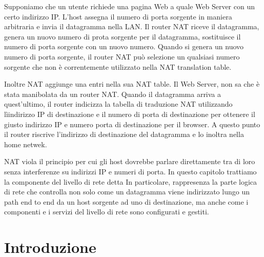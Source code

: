 \documentclass{book}
\newcommand{\tmtextbf}[1]{\text{{\bfseries{#1}}}}
\begin{document}
Supponiamo che un utente richiede una pagina Web a quale Web Server con un
certo indirizzo IP. L'host assegna il numero di porta sorgente in maniera
arbitraria e invia il datagramma nella LAN. Il router NAT riceve il
datagramma, genera un nuovo numero di prota sorgente per il datagramma,
sostituisce il numero di porta sorgente con un nuovo numero. Quando si genera
un nuovo numero di porta sorgente, il router NAT pu{\`o} selezione un
qualsiasi numero sorgente che non {\`e} correntemente utilizzato nella NAT
translation table.

Inoltre NAT aggiunge una entri nella sua NAT table. Il Web Server, non sa che
{\`e} stata manibolata da un router NAT. Quando il datagramma arriva a
quest'ultimo, il router indicizza la tabella di traduzione NAT utilizzando
l{\`i}indirizzo IP di destinazione e il numero di porta di destinazione per
ottenere il giusto indirizzo IP e numero porta di destinazione per il browser.
A questo punto il router riscrive l'indirizzo di destinazione del datagramma e
lo inoltra nella home netwek.

NAT viola il principio per cui gli host dovrebbe parlare direttamente tra di
loro senza interferenze su indirizzi IP e numeri di porta.
{}
In questo capitolo trattiamo la componente del livello di rete detta
\tmtextbf{control-plane.} In particolare, rappresenza la parte logica di rete
che controlla non solo come un datagramma viene indirizzato lungo un path end
to end da un host sorgente ad uno di destinazione, ma anche come i componenti
e i servizi del livello di rete sono configurati e gestiti.

\section{Introduzione}
\end{document}
